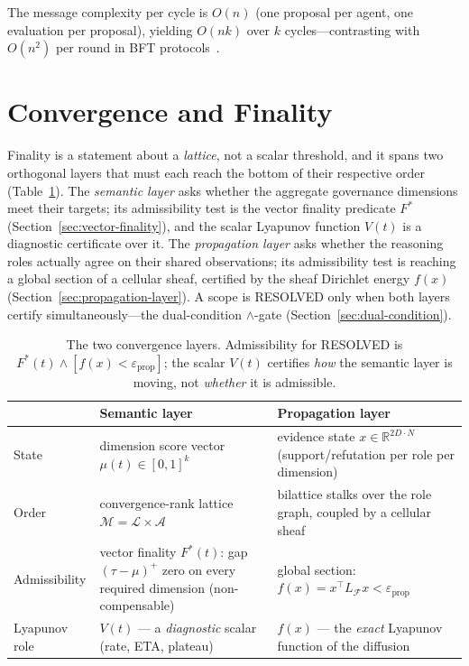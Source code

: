\documentclass[11pt]{article}
\begin{document}
The message complexity per cycle is $O(n)$ (one proposal per agent, one evaluation per proposal), yielding $O(nk)$ over $k$ cycles---contrasting with $O(n^2)$ per round in BFT protocols~\cite{castro1999}.

\section{Convergence and Finality}
\label{sec:convergence}

Finality is a statement about a \emph{lattice}, not a scalar threshold, and it spans two orthogonal layers that must each reach the bottom of their respective order (Table~\ref{tab:two-layer}). The \emph{semantic layer} asks whether the aggregate governance dimensions meet their targets; its admissibility test is the vector finality predicate $F^*$ (Section~\ref{sec:vector-finality}), and the scalar Lyapunov function $V(t)$ is a diagnostic certificate over it. The \emph{propagation layer} asks whether the reasoning roles actually agree on their shared observations; its admissibility test is reaching a global section of a cellular sheaf, certified by the sheaf Dirichlet energy $f(x)$ (Section~\ref{sec:propagation-layer}). A scope is RESOLVED only when both layers certify simultaneously---the dual-condition $\wedge$-gate (Section~\ref{sec:dual-condition}).

\begin{table}[H]
\centering
\small
\begin{tabular}{p{2.4cm}p{4.7cm}p{4.7cm}}
\toprule
 & \textbf{Semantic layer} & \textbf{Propagation layer} \\
\midrule
State & dimension score vector $\mu(t) \in [0,1]^k$ & evidence state $x \in \mathbb{R}^{2D\cdot N}$ (support/refutation per role per dimension) \\
Order & convergence-rank lattice $\mathcal{M} = \mathcal{L}\times\mathcal{A}$ & bilattice stalks over the role graph, coupled by a cellular sheaf \\
Admissibility & vector finality $F^*(t)$: gap $(\tau-\mu)^+$ zero on every required dimension (non-compensable) & global section: $f(x) = x^\top L_{\mathcal{F}} x < \varepsilon_{\mathrm{prop}}$ \\
Lyapunov role & $V(t)$ --- a \emph{diagnostic} scalar (rate, ETA, plateau) & $f(x)$ --- the \emph{exact} Lyapunov function of the diffusion \\
\bottomrule
\end{tabular}
\caption{The two convergence layers. Admissibility for RESOLVED is $F^*(t) \wedge [f(x) < \varepsilon_{\mathrm{prop}}]$; the scalar $V(t)$ certifies \emph{how} the semantic layer is moving, not \emph{whether} it is admissible.}
\label{tab:two-layer}
\end{table}
\end{document}
